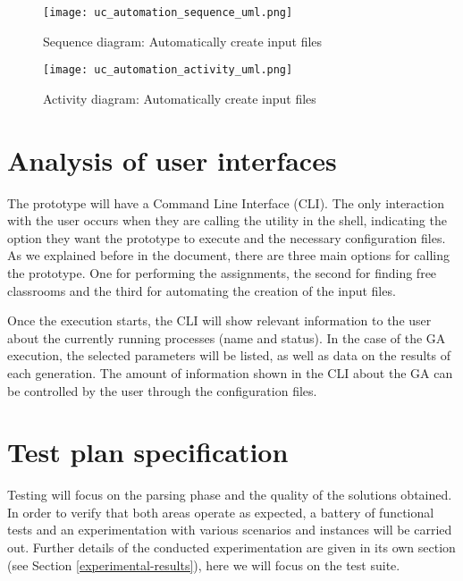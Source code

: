 \begin{figure}[H]
    \caption{Sequence diagram: Automatically create input files}
  \centering
  \texttt{[image: uc\_automation\_sequence\_uml.png]}
\end{figure}


\begin{figure}[H]
    \caption{Activity diagram: Automatically create input files}
  \centering
  \texttt{[image: uc\_automation\_activity\_uml.png]}
\end{figure}




\section{Analysis of user interfaces}

The prototype will have a Command Line Interface (CLI). The only interaction with the user occurs when they are calling the utility in the shell, indicating the option they want the prototype to execute and the necessary configuration files. As we explained before in the document, there are three main options for calling the prototype. One for performing the assignments, the second for finding free classrooms and the third for automating the creation of the input files.

Once the execution starts, the CLI will show relevant information to the user about the currently running processes (name and status). In the case of the GA execution, the selected parameters will be listed, as well as data on the results of each generation. The amount of information shown in the CLI about the GA can be controlled by the user through the configuration files. 



\section{Test plan specification}

Testing will focus on the parsing phase and the quality of the solutions obtained. In order to verify that both areas operate as expected, a battery of functional tests and an experimentation with various scenarios and instances will be carried out. Further details of the conducted experimentation are given in its own section (see Section \ref{experimental-results}), here we will focus on the test suite.



